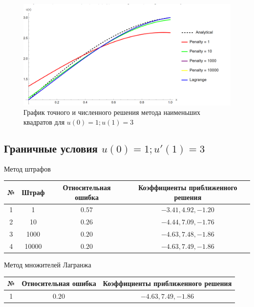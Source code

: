 \documentclass[12pt,a4paper]{article}
\begin{document}
\begin{figure}[h]
	\centering
	\includegraphics[width=1\textwidth]{m-3-1.PNG}
	\caption{График точного и численного решения метода наименьших квадратов для $u(0) = 1; u(1) = 3$}
\end{figure}

\subsection{Граничные условия $u(0) = 1; u'(1) = 3$}

\begin{center}
	Метод штрафов
	\begin{tabular}{|c|c|c|c|} 
		\hline
		№ & Штраф & Относительная ошибка & Коэффициенты приближенного решения \\ 
		\hline
		1 & 1 &$0.57$ & ${-3.41,4.92,-1.20}$ \\ 
		\hline
		2 & 10 &$0.26$ & ${-4.44,7.09,-1.76}$ \\ 
		\hline
		3 & 1000 &$0.20$ & ${-4.63,7.48,-1.86}$ \\ 
		\hline
		4 & 10000 &$0.20$ & ${-4.63,7.49,-1.86}$ \\ 
		\hline
	\end{tabular}
\end{center}

\begin{center}
	Метод множителей Лагранжа
	\begin{tabular}{|c|c|c|} 
		\hline
		№ & Относительная ошибка & Коэффициенты приближенного решения \\ 
		\hline
		1 & $0.20$ & ${-4.63,7.49,-1.86}$ \\ 
		\hline
	\end{tabular}
\end{center}
\end{document}
